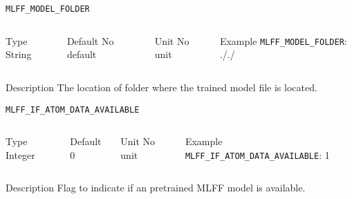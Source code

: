 \begin{frame}[allowframebreaks]{\texttt{{MLFF\_MODEL\_FOLDER}}} \label{MLFF_MODEL_FOLDER}
\vspace*{-12pt}
\begin{columns}
\begin{block}{Type}
String
\end{block}

\begin{block}{Default}
No default
\end{block}

\begin{block}{Unit}
No unit
\end{block}

\begin{block}{Example}
\texttt{MLFF\_MODEL\_FOLDER}: ././
\end{block}
\end{columns}

\begin{block}{Description}
 The location of folder where the trained model file is located.
\end{block}

%
\end{frame}



\begin{frame}[allowframebreaks]{\texttt{{MLFF\_IF\_ATOM\_DATA\_AVAILABLE}}} \label{MLFF_IF_ATOM_DATA_AVAILABLE}
\vspace*{-12pt}
\begin{columns}
\begin{block}{Type}
Integer
\end{block}

\begin{block}{Default}
0
\end{block}

\begin{block}{Unit}
No unit
\end{block}

\begin{block}{Example}
\texttt{MLFF\_IF\_ATOM\_DATA\_AVAILABLE}: 1
\end{block}
\end{columns}

\begin{block}{Description}
 Flag to indicate if an pretrained MLFF model is available. 
\end{block}

%
\end{frame}

